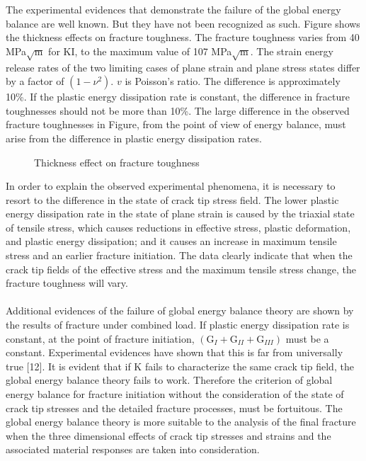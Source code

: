 \documentclass[12pt]{article}
\begin{document}
The experimental evidences that demonstrate the failure of the global energy balance are well known.
But they have not been recognized as such. Figure shows the thickness effects on fracture toughness.
The fracture toughness varies from 40 MPa$\sqrt{\text{m}}$ for KI, to the maximum value of 107 MPa$\sqrt{\text{m}}$. The
strain energy release rates of the two limiting cases of plane strain and plane stress states differ by a
factor of $(1 - \nu ^ 2)$. $v$ is Poisson’s ratio. The difference is approximately 10\%. If the plastic energy
dissipation rate is constant, the difference in fracture toughnesses should not be more than 10\%. The
large difference in the observed fracture toughnesses in Figure, from the point of view of energy balance,
must arise from the difference in plastic energy dissipation rates.

\begin{figure}[H]
    \centering
    \captionsetup{labelformat=empty}
    \caption{Thickness effect on fracture toughness}
\end{figure}
In order to explain the observed experimental phenomena, it is necessary to resort to the difference
in the state of crack tip stress field. The lower plastic energy dissipation rate in the state of plane strain is
caused by the triaxial state of tensile stress, which causes reductions in effective stress, plastic
deformation, and plastic energy dissipation; and it causes an increase in maximum tensile stress and an
earlier fracture initiation. The data clearly indicate that when the crack tip fields of the effective stress
and the maximum tensile stress change, the fracture toughness will vary.\\\\
Additional evidences of the failure of global energy balance theory are shown by the results of
fracture under combined load. If plastic energy dissipation rate is constant, at the point of fracture
initiation, $(\text{G}_{I} + \text{G}_{II} + \text{G}_{III})$ must be a constant. Experimental evidences have shown that this is far from
universally true [12]. It is evident that if K fails to characterize the same crack tip field, the global energy
balance theory fails to work. Therefore the criterion of global energy balance for fracture initiation
without the consideration of the state of crack tip stresses and the detailed fracture processes, must be
fortuitous. The global energy balance theory is more suitable to the analysis of the final fracture when
the three dimensional effects of crack tip stresses and strains and the associated material responses are
taken into consideration.
\end{document}
